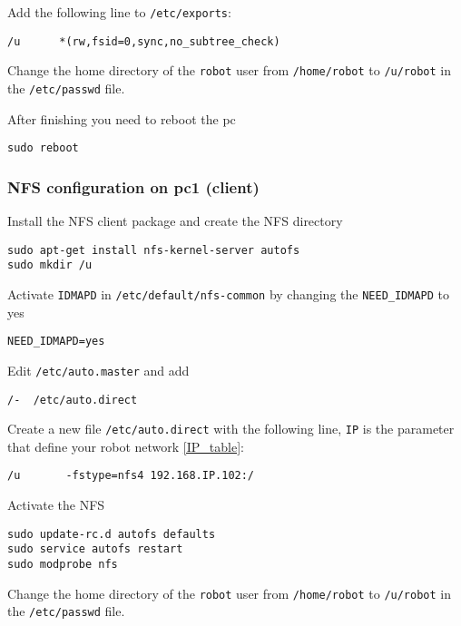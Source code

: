 Add the following line to \texttt{/etc/exports}:

\begin{lstlisting}
/u      *(rw,fsid=0,sync,no_subtree_check)
\end{lstlisting}


Change the home directory of the \texttt{robot} user from \texttt{/home/robot} to \texttt{/u/robot} in the \texttt{/etc/passwd} file.

After finishing you need to reboot the pc

\begin{lstlisting}
sudo reboot
\end{lstlisting}

\subsubsection{NFS configuration on pc1 (client)}
Install the NFS client package and create the NFS directory

\begin{lstlisting}
sudo apt-get install nfs-kernel-server autofs
sudo mkdir /u
\end{lstlisting}

Activate \texttt{IDMAPD} in \texttt{/etc/default/nfs-common} by changing the \texttt{NEED\_IDMAPD} to yes

\begin{lstlisting} 
NEED_IDMAPD=yes
\end{lstlisting}

Edit \texttt{/etc/auto.master} and add

\begin{lstlisting}
/-	/etc/auto.direct
\end{lstlisting}

Create a new file \texttt{/etc/auto.direct} with the following line, \texttt{IP} is the parameter that define your robot network \ref{IP_table}:

\begin{lstlisting}
/u       -fstype=nfs4 192.168.IP.102:/
\end{lstlisting}

Activate the NFS

\begin{lstlisting}
sudo update-rc.d autofs defaults
sudo service autofs restart
sudo modprobe nfs
\end{lstlisting}

Change the home directory of the \texttt{robot} user from \texttt{/home/robot} to \texttt{/u/robot} in the \texttt{/etc/passwd} file.

